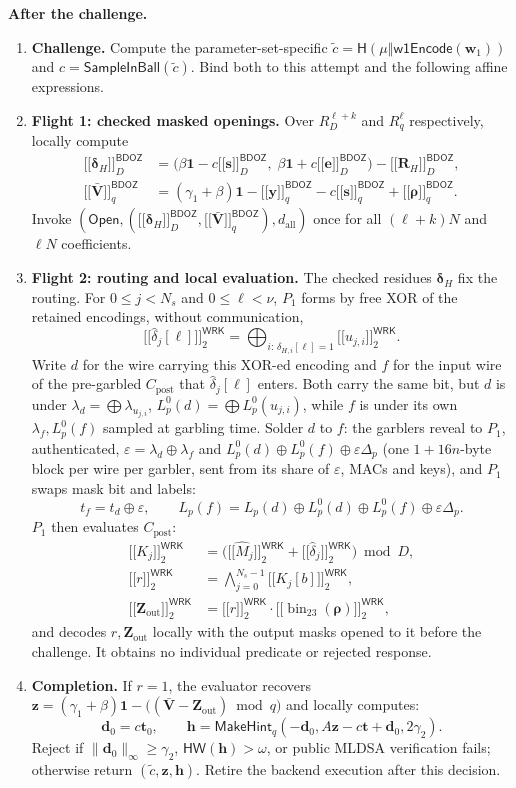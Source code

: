 \documentclass[10pt,letterpaper]{article}
\newcommand{\typedshare}[3]{\mathopen{[\![}#1\mathclose{]\!]}_{#2}^{\mathsf{#3}}}
\newcommand{\sh}[2]{\typedshare{#1}{#2}{BDOZ}}
\newcommand{\ws}[1]{\typedshare{#1}{2}{WRK}}
\newcommand{\vct}[1]{\bm{#1}}
\newcommand{\one}{\mathbf{1}}
\newcommand{\bin}{\operatorname{bin}}
\newcommand{\Open}{\mathsf{Open}}
\newcommand{\post}{C_{\mathrm{post}}}
\newcommand{\dall}{d_{\mathrm{all}}}
\newcommand{\routed}{\bigoplus_{i:\,\delta_{H,i}[\ell]=1}}
\begin{document}
\begin{mdframed}[style=protocol]
\textbf{After the challenge.}
\begin{enumerate}[start=4]
\item \textbf{Challenge.} Compute the parameter-set-specific
$\widetilde c=\mathsf{H}(\mu\mathbin\Vert\mathsf{w1Encode}(\vct{w}_1))$ and
$c=\mathsf{SampleInBall}(\widetilde c)$. Bind both to this attempt and the following affine expressions.
\item \textbf{Flight 1: checked masked openings.} Over $R_D^{\ell+k}$ and
$R_q^\ell$ respectively, locally compute
\begin{align*}
\sh{\vct{\delta}_H}{D}&=
 \bigl(\beta\one-c\sh{\vct{s}}{D},\;\beta\one+c\sh{\vct{e}}{D}\bigr)
 -\sh{\vct{R}_H}{D},\\
\sh{\bar{\vct{V}}}{q}&=(\gamma_1+\beta)\one-\sh{\vct{y}}{q}
 -c\sh{\vct{s}}{q}+\sh{\vct{\rho}}{q}.
\end{align*}
Invoke $(\Open,(\sh{\vct{\delta}_H}{D},\sh{\bar{\vct{V}}}{q}),\dall)$
once for all $(\ell+k)N$ and $\ell N$ coefficients.
\item \textbf{Flight 2: routing and local evaluation.} The checked residues
$\vct{\delta}_H$ fix the routing. For $0\leq j<N_s$ and $0\leq\ell<\nu$, $P_1$
forms by free XOR of the retained encodings, without communication,
\[
\ws{\widehat\delta_j[\ell]}=\routed\ws{u_{j,i}} .
\]
Write $d$ for the wire carrying this XOR-ed encoding and $f$ for the input wire
of the pre-garbled $\post$ that $\widehat\delta_j[\ell]$ enters. Both carry the
same bit, but $d$ is under $\lambda_d=\bigoplus\lambda_{u_{j,i}}$,
$L_p^0(d)=\bigoplus L_p^0(u_{j,i})$, while $f$ is under its own
$\lambda_f,L_p^0(f)$ sampled at garbling time.
Solder $d$ to $f$: the garblers
reveal to $P_1$, authenticated, $\varepsilon=\lambda_d\oplus\lambda_f$ and
$L_p^0(d)\oplus L_p^0(f)\oplus\varepsilon\Delta_p$ (one $1{+}16n$-byte block per
wire per garbler, sent from its share of $\varepsilon$, MACs and keys), and $P_1$
swaps mask bit and labels:
\[
t_f=t_d\oplus\varepsilon,\qquad
L_p(f)=L_p(d)\oplus L_p^0(d)\oplus L_p^0(f)\oplus\varepsilon\Delta_p .
\]
$P_1$ then evaluates $\post$:
\begin{align*}
\ws{K_j}&=\bigl(\ws{\widehat M_j}+\ws{\widehat\delta_j}\bigr)\bmod D,\\
\ws{r}&=\bigwedge_{j=0}^{N_s-1}\ws{K_j[b]},\\
\ws{\vct{Z}_{\mathrm{out}}}&=\ws{r}\cdot\ws{\bin_{23}(\vct{\rho})},
\end{align*}
and decodes $r,\vct{Z}_{\mathrm{out}}$ locally with the output masks opened to it
before the challenge. It obtains no individual predicate or rejected response.
\item \textbf{Completion.} If $r=1$, the evaluator recovers
$\vct{z}=(\gamma_1+\beta)\one-\bigl((\bar{\vct{V}}-\vct{Z}_{\mathrm{out}})\bmod q\bigr)$
and locally computes:
\[
\vct{d}_0=c\vct{t}_0,\qquad
\vct{h}=\mathsf{MakeHint}_q(-\vct{d}_0,A\vct{z}-c\vct{t}+\vct{d}_0,2\gamma_2).
\]
Reject if $\|\vct{d}_0\|_\infty\geq\gamma_2$, $\mathsf{HW}(\vct{h})>\omega$,
or public MLDSA verification fails; otherwise return $(\widetilde c,\vct{z},\vct{h})$.
Retire the backend execution after this decision.
\end{enumerate}
\end{mdframed}
\end{document}
